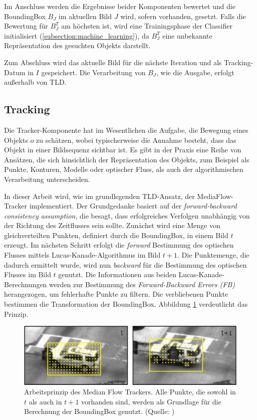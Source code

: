 	Im Anschluss werden die Ergebnisse beider Komponenten bewertet und die BoundingBox $B_J$ im aktuellen Bild $J$ wird, sofern vorhanden, gesetzt. Falls die Bewertung für $B_J^T$ am höchsten ist, wird eine Trainingsphase der Classifier initialisiert (\ref{subsection:machine_learning}), da $B_J^T$ eine unbekannte Repräsentation des gesuchten Objekts darstellt.

	Zum Abschluss wird das aktuelle Bild für die nächste Iteration und als Tracking-Datum in $I$ gespeichert. Die Verarbeitung von $B_J$, wie die Ausgabe, erfolgt außerhalb von TLD.

	\subsection{Tracking}
	\label{subsection:tracking}
	Die Tracker-Komponente hat im Wesentlichen die Aufgabe, die Bewegung eines Objekts $o$ zu schätzen, wobei typischerweise die Annahme besteht, dass das Objekt in einer Bildsequenz sichtbar ist. Es gibt in der Praxis eine Reihe von Ansätzen, die sich hinsichtlich der Repräsentation des Objekts, zum Beispiel als Punkte, Konturen, Modelle oder optischer Fluss, als auch der algorithmischen Verarbeitung unterscheiden.

	In dieser Arbeit wird, wie im grundlegenden TLD-Ansatz, der MediaFlow- Tracker \cite{MFT} implementiert. Der Grundgedanke basiert auf der\textit{ forward-backward consistency assumption}, die besagt, dass erfolgreiches Verfolgen unabhängig von der Richtung des Zeitflusses sein sollte. Zunächst wird eine Menge von gleichverteilten Punkten, definiert durch die BoundingBox, in einem Bild $t$ erzeugt. Im nächsten Schritt erfolgt die \textit{forward} Bestimmung des optischen Flusses mittels Lucas-Kanade-Algorithmus \cite{OPT} im Bild $t+1$. Die Punktemenge, die dadurch ermittelt wurde, wird nun \textit{backward} für die Bestimmung des optischen Flusses im Bild $t$ genutzt. Die Informationen aus beiden Lucas-Kanade-Berechnungen werden zur Bestimmung des \textit{Forward-Backward Errors (FB)} herangezogen, um fehlerhafte Punkte zu filtern. Die verbliebenen Punkte bestimmen die Transformation der BoundingBox. Abbildung \ref{fig:MFT} verdeutlicht das Prinzip.

	\begin{figure}
	\centering{}\includegraphics[scale=0.7]{../pictures/MediaFlow_0.png}\caption[Arbeitsweise des Median-Flow-Trackers]{Arbeitsprinzip des Median Flow Trackers. Alle Punkte, die sowohl in $t$ als auch in $t+1$ vorhanden sind, werden als Grundlage für die Berechnung der BoundingBox genutzt. (Quelle: \cite{MFT})\label{fig:MFT} }
	\end{figure}

